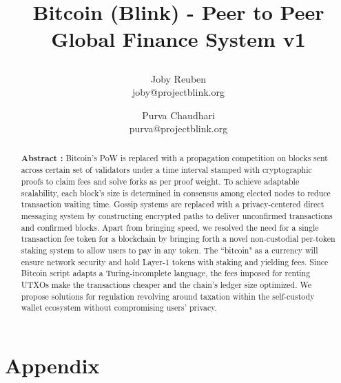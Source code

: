 \documentclass[a4paper,10pt]{article}
\title{
 \large \textbf{Bitcoin (Blink) - Peer to Peer Global Finance System v1}
\author{ \myfontt Joby Reuben \\ \myfontt joby@projectblink.org \and  \myfontt Purva Chaudhari \\ \myfontt purva@projectblink.org}}
\date{}
\begin{document}
\maketitle
\begin{abstract}
\noindent \textbf{Abstract :} Bitcoin's PoW is replaced with a propagation competition on blocks sent across certain set of validators under a time interval stamped with cryptographic proofs to claim fees and solve forks as per proof weight. To achieve adaptable scalability, each block's size is determined in consensus among elected nodes to reduce transaction waiting time. Gossip systems are replaced with a privacy-centered direct messaging system by constructing encrypted paths to deliver unconfirmed transactions and confirmed blocks. Apart from bringing speed, we resolved the need for a single transaction fee token for a blockchain by bringing forth a novel non-custodial per-token staking system to allow users to pay in any token. The ``bitcoin" as a currency will ensure network security and hold Layer-1 tokens with staking and yielding fees. Since Bitcoin script adapts a Turing-incomplete language, the fees imposed for renting UTXOs make the transactions cheaper and the chain's ledger size optimized. We propose solutions for regulation revolving around taxation within the self-custody wallet ecosystem without compromising users' privacy. 
\end{abstract}














\newpage
\normalsize
\appendix
\section{Appendix}















\end{document}
